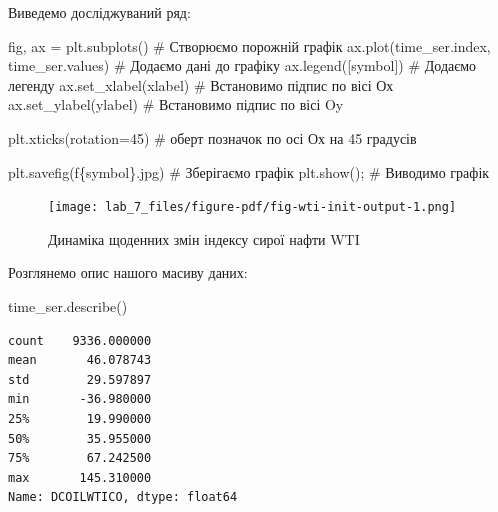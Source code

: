 \documentclass[
  letterpaper,
]{report}
\newenvironment{Shaded}{\begin{snugshade}}{\end{snugshade}}
\newcommand{\CommentTok}[1]{\textcolor[rgb]{0.37,0.37,0.37}{#1}}
\newcommand{\DecValTok}[1]{\textcolor[rgb]{0.68,0.00,0.00}{#1}}
\newcommand{\NormalTok}[1]{\textcolor[rgb]{0.00,0.23,0.31}{#1}}
\newcommand{\OperatorTok}[1]{\textcolor[rgb]{0.37,0.37,0.37}{#1}}
\newcommand{\SpecialCharTok}[1]{\textcolor[rgb]{0.37,0.37,0.37}{#1}}
\newcommand{\SpecialStringTok}[1]{\textcolor[rgb]{0.13,0.47,0.30}{#1}}
\begin{document}
Виведемо досліджуваний ряд:

\begin{Shaded}
\begin{Highlighting}[]
\NormalTok{fig, ax }\OperatorTok{=}\NormalTok{ plt.subplots()                   }\CommentTok{\# Створюємо порожній графік}
\NormalTok{ax.plot(time\_ser.index, time\_ser.values)   }\CommentTok{\# Додаємо дані до графіку}
\NormalTok{ax.legend([symbol])                        }\CommentTok{\# Додаємо легенду}
\NormalTok{ax.set\_xlabel(xlabel)                      }\CommentTok{\# Встановимо підпис по вісі Ох}
\NormalTok{ax.set\_ylabel(ylabel)                      }\CommentTok{\# Встановимо підпис по вісі Oy}

\NormalTok{plt.xticks(rotation}\OperatorTok{=}\DecValTok{45}\NormalTok{)                    }\CommentTok{\# оберт позначок по осі Ох на 45 градусів}

\NormalTok{plt.savefig(}\SpecialStringTok{f\textquotesingle{}}\SpecialCharTok{\{}\NormalTok{symbol}\SpecialCharTok{\}}\SpecialStringTok{.jpg\textquotesingle{}}\NormalTok{)               }\CommentTok{\# Зберігаємо графік }
\NormalTok{plt.show()}\OperatorTok{;}                                \CommentTok{\# Виводимо графік}
\end{Highlighting}
\end{Shaded}

\begin{figure}[H]

{\centering \texttt{[image: lab\_7\_files/figure-pdf/fig-wti-init-output-1.png]}

}

\caption{\label{fig-wti-init}Динаміка щоденних змін індексу сирої нафти
WTI}

\end{figure}

Розглянемо опис нашого масиву даних:

\begin{Shaded}
\begin{Highlighting}[]
\NormalTok{time\_ser.describe()}
\end{Highlighting}
\end{Shaded}

\begin{verbatim}
count    9336.000000
mean       46.078743
std        29.597897
min       -36.980000
25%        19.990000
50%        35.955000
75%        67.242500
max       145.310000
Name: DCOILWTICO, dtype: float64
\end{verbatim}
\end{document}
